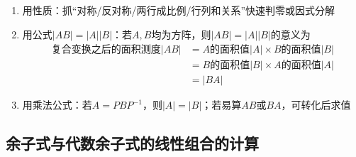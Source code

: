 \documentclass[./linear_algebra.tex]{subfiles}
\begin{document}
    \begin{enumerate}
        \item 用性质：抓“对称/反对称/两行成比例/行列和关系”快速判零或因式分解
        \item 用公式$|AB| = |A||B|$：若$A, B$均为方阵，则$|AB| = |A||B|$的意义为
        \begin{align*}
            \text{复合变换之后的面积测度}|AB| &= A\text{的面积值}|A|\times B\text{的面积值}|B| \\
            &= B\text{的面积值}|B|\times A\text{的面积值}|A| \\
            &= |BA|
        \end{align*}
        \item 用乘法公式：若$A=PBP^{-1}$，则$|A|=|B|$；若易算$AB$或$BA$，可转化后求值
    \end{enumerate}

    \subsection{余子式与代数余子式的线性组合的计算}
\end{document}
